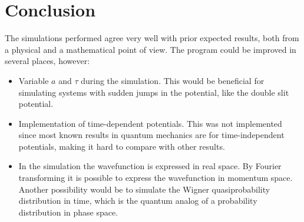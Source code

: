 \newpage
\section*{Conclusion}
The simulations performed agree very well with prior expected results, both from a physical and a mathematical point of view. The program could be improved in several places, however:

\begin{itemize}
\item Variable $a$ and $\tau$ during the simulation. This would be beneficial for simulating systems with sudden jumps in the potential, like the double slit potential.
\item Implementation of time-dependent potentials. This was not implemented since most known results in quantum mechanics are for time-independent potentials, making it hard to compare with other results.
\item In the simulation the wavefunction is expressed in real space. By Fourier transforming it is possible to express the wavefunction in momentum space. Another possibility would be to simulate the Wigner quasiprobability distribution in time, which is the quantum analog of a probability distribution in phase space.
\end{itemize}

